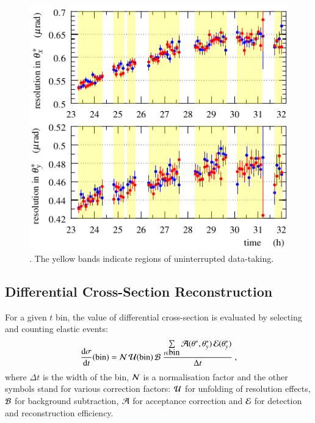 \begin{figure}
\begin{center}
\includegraphics{fig/resolutions_vs_time.pdf}
\caption{%
. The yellow bands indicate regions of uninterrupted data-taking.
}
\label{fig:resol final}
\end{center}
\end{figure}

\subsection{Differential Cross-Section Reconstruction}
\label{sec:diff cs}

For a given $t$ bin, the value of differential cross-section is evaluated by selecting and counting elastic events:
\begin{equation}
{\d\sigma\over \d t}(\hbox{bin}) =
	{\cal N}\, {\cal U}({\rm bin})\, {\cal B}\ 
	{\sum\limits_{t \in \hbox{bin}} {\cal A}(\theta^*, \theta_y^*)\, {\cal E}(\theta_y^*)\over \Delta t}\ ,
\end{equation}
where $\Delta t$ is the width of the bin, ${\cal N}$ is a normalisation factor and the other symbols stand for various correction factors:
 ${\cal U}$ for unfolding of resolution effects, ${\cal B}$ for background subtraction, ${\cal A}$ for acceptance correction and ${\cal E}$ for detection and reconstruction efficiency.

